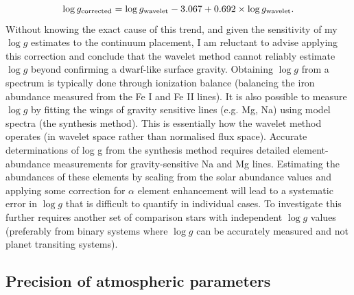 \begin{equation}\label{logg_corr}
\log g_{\rm corrected} = \log g_{\rm wavelet} - 3.067 + 0.692\times \log g_{\rm wavelet}.
\end{equation}
Without knowing the exact cause of this trend, and given the sensitivity of my $\log g$ estimates to the continuum placement,  I am reluctant to advise applying this correction and conclude that the wavelet method cannot reliably estimate $\log g$ beyond confirming a dwarf-like surface gravity. Obtaining $\log g$ from a spectrum is typically done through ionization balance (balancing the iron abundance measured from the Fe
I and Fe II lines). It is also possible to measure  $\log g$  by fitting the wings of gravity sensitive lines (e.g. Mg, Na) using model spectra (the synthesis method). This is essentially how the wavelet method operates (in wavelet space rather than normalised flux space). Accurate determinations of log g from the synthesis method requires detailed element-abundance measurements for gravity-sensitive Na and Mg lines. Estimating the abundances of these elements by scaling from the solar abundance values and applying some correction for $\alpha$ element enhancement will lead to a systematic error in $\log g $ that is difficult to quantify in individual cases. To investigate this further requires another set of comparison stars with independent $\log g$ values (preferably from binary systems where $\log g$ can be accurately measured and not planet transiting systems). 



\subsection{\textbf{Precision of atmospheric parameters}}\label{precision_w}

